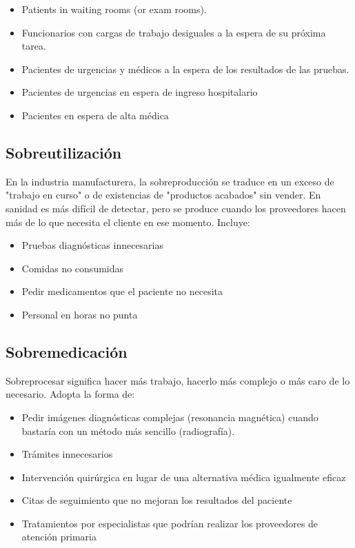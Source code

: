 \begin{itemize}
    \item Patients in waiting rooms (or exam rooms).
    \item Funcionarios con cargas de trabajo desiguales a la espera de su próxima tarea.
    \item Pacientes de urgencias y médicos a la espera de los resultados de las pruebas.
    \item Pacientes de urgencias en espera de ingreso hospitalario
    \item Pacientes en espera de alta médica
\end{itemize}

\subsection{Sobreutilización}

En la industria manufacturera, la sobreproducción se traduce en un exceso de "trabajo en curso" o de existencias de "productos acabados" sin vender. En sanidad es más difícil de detectar, pero se produce cuando los proveedores hacen más de lo que necesita el cliente en ese momento. Incluye:

\begin{itemize}
    \item Pruebas diagnósticas innecesarias
    \item Comidas no consumidas
    \item Pedir medicamentos que el paciente no necesita
    \item Personal en horas no punta
\end{itemize}

\subsection{Sobremedicación}

Sobreprocesar significa hacer más trabajo, hacerlo más complejo o más caro de lo necesario. Adopta la forma de:

\begin{itemize}
    \item Pedir imágenes diagnósticas complejas (resonancia magnética) cuando bastaría con un método más sencillo (radiografía).
    \item Trámites innecesarios
    \item Intervención quirúrgica en lugar de una alternativa médica igualmente eficaz
    \item Citas de seguimiento que no mejoran los resultados del paciente
    \item Tratamientos por especialistas que podrían realizar los proveedores de atención primaria
\end{itemize}

